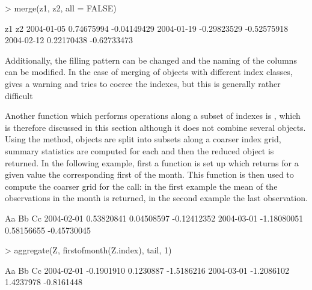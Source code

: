 \documentclass{Z}
\begin{document}
\begin{Schunk}
\begin{Sinput}
> merge(z1, z2, all = FALSE)
\end{Sinput}
\begin{Soutput}
           z1          z2         
2004-01-05  0.74675994 -0.04149429
2004-01-19 -0.29823529 -0.52575918
2004-02-12  0.22170438 -0.62733473
\end{Soutput}
\end{Schunk}
Additionally, the filling pattern can be changed and the naming of the
columns can be modified. In the case of merging of objects with 
different index classes,  gives a warning and tries to
coerce the indexes, but this is generally rather difficult


Another function which performs operations along a subset of indexes
is , which is therefore discussed in this section although
it does not combine several objects. Using the  method,  objects
are split into subsets along a coarser index grid,
summary statistics are computed for each and then the 
reduced object is returned. In the following example,
first a function is set up which returns for a given 
value the corresponding first of the month. This function is then
used to compute the coarser grid for the  call: in
the first example the mean of the observations in the month
is returned, in the second example the last observation.

\begin{Schunk}
\begin{Soutput}
           Aa          Bb          Cc         
2004-02-01  0.53820841  0.04508597 -0.12412352
2004-03-01 -1.18080051  0.58156655 -0.45730045
\end{Soutput}
\begin{Sinput}
> aggregate(Z, firstofmonth(Z.index), tail, 1)
\end{Sinput}
\begin{Soutput}
           Aa         Bb         Cc        
2004-02-01 -0.1901910  0.1230887 -1.5186216
2004-03-01 -1.2086102  1.4237978 -0.8161448
\end{Soutput}
\end{Schunk}
\end{document}
